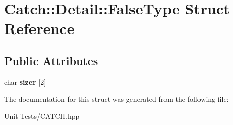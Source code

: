 \hypertarget{structCatch_1_1Detail_1_1FalseType}{}\section{Catch\+:\+:Detail\+:\+:False\+Type Struct Reference}
\label{structCatch_1_1Detail_1_1FalseType}
\subsection*{Public Attributes}
\begin{DoxyCompactItemize}
\item 
char {\bfseries sizer} \mbox{[}2\mbox{]}\hypertarget{structCatch_1_1Detail_1_1FalseType_abc1a730e197d6f7750ae8aaf47b63477}{}\label{structCatch_1_1Detail_1_1FalseType_abc1a730e197d6f7750ae8aaf47b63477}

\end{DoxyCompactItemize}


The documentation for this struct was generated from the following file\+:\begin{DoxyCompactItemize}
\item 
Unit Tests/C\+A\+T\+C\+H.\+hpp\end{DoxyCompactItemize}
